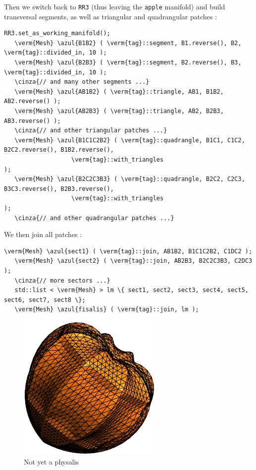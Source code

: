 Then we switch back to {\small\tt RR3} (thus leaving the {\small\tt apple} manifold) and build
transversal segments, as well as triangular and quadrangular patches :

\begin{Verbatim}[commandchars=\\\{\},formatcom=\small\tt,frame=single,
   label=parag-\ref{\numb section 2.\numb parag 11}.cpp,rulecolor=\color{coment},
   baselinestretch=0.94,framesep=2mm]
   RR3.set_as_working_manifold();
   \verm{Mesh} \azul{B1B2} ( \verm{tag}::segment, B1.reverse(), B2, \verm{tag}::divided_in, 10 );
   \verm{Mesh} \azul{B2B3} ( \verm{tag}::segment, B2.reverse(), B3, \verm{tag}::divided_in, 10 );
   \cinza{// and many other segments ...}
   \verm{Mesh} \azul{AB1B2} ( \verm{tag}::triangle, AB1, B1B2, AB2.reverse() );
   \verm{Mesh} \azul{AB2B3} ( \verm{tag}::triangle, AB2, B2B3, AB3.reverse() );
   \cinza{// and other triangular patches ...}
   \verm{Mesh} \azul{B1C1C2B2} ( \verm{tag}::quadrangle, B1C1, C1C2, B2C2.reverse(), B1B2.reverse(),
                   \verm{tag}::with_triangles                                           );
   \verm{Mesh} \azul{B2C2C3B3} ( \verm{tag}::quadrangle, B2C2, C2C3, B3C3.reverse(), B2B3.reverse(),
                   \verm{tag}::with_triangles                                           );
   \cinza{// and other quadrangular patches ...}   
\end{Verbatim}

We then join all patches :
\begin{Verbatim}[commandchars=\\\{\},formatcom=\small\tt,frame=single,
   label=parag-\ref{\numb section 2.\numb parag 11}.cpp,rulecolor=\color{coment},
   baselinestretch=0.94,framesep=2mm]
   \verm{Mesh} \azul{sect1} ( \verm{tag}::join, AB1B2, B1C1C2B2, C1DC2 );
   \verm{Mesh} \azul{sect2} ( \verm{tag}::join, AB2B3, B2C2C3B3, C2DC3 );
   \cinza{// more sectors ...}
   std::list < \verm{Mesh} > lm \{ sect1, sect2, sect3, sect4, sect5, sect6, sect7, sect8 \};
   \verm{Mesh} \azul{fisalis} ( \verm{tag}::join, lm ); 
\end{Verbatim}

\begin{figure}[ht] \centering
  \includegraphics[width=70mm]{fisalis-round}
  \caption{Not yet a physalis}
  \label{\numb section 2.\numb fig 13}
\end{figure}

